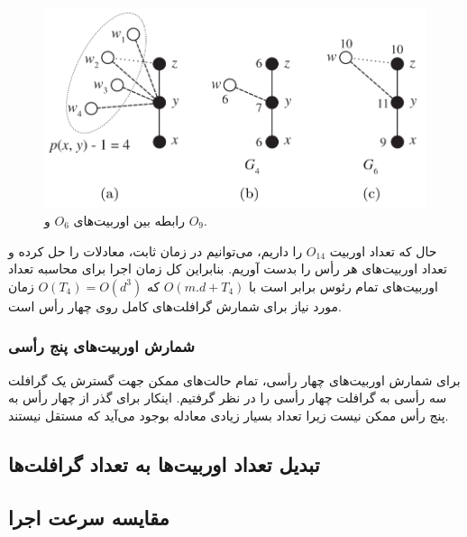 \begin{figure}[b]
\centering
\includegraphics[scale=0.3]{./4-node-graphlet-2.png}
\caption{رابطه بین اوربیت‌های $O_6$ و $O_9$.}
\label{fig:svm-margin}
\end{figure}

حال که تعداد اوربیت $O_{14}$ را داریم، می‌توانیم در زمان ثابت، معادلات را حل کرده و تعداد اوربیت‌های هر رأس را بدست آوریم. بنابراین کل زمان اجرا برای محاسبه تعداد اوربیت‌های تمام رئوس برابر است با $O(m.d+T_4)$ که $O(T_4) = O(d^3)$ زمان مورد نیاز برای شمارش گرافلت‌های کامل روی چهار رأس است.



\subsubsection{شمارش اوربیت‌های پنج رأسی}
برای شمارش اوربیت‌های چهار رأسی، تمام حالت‌های ممکن جهت گسترش یک گرافلت سه رأسی به گرافلت چهار رأسی را در نظر گرفتیم. اینکار برای گذر از چهار رأس به پنج رأس ممکن نیست زیرا تعداد بسیار زیادی معادله بوجود می‌آید که مستقل نیستند. 

\subsection{تبدیل تعداد اوربیت‌ها به تعداد گرافلت‌ها}

\subsection{مقایسه سرعت اجرا}

